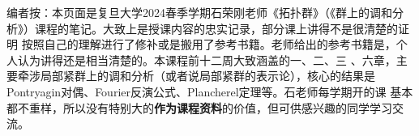 \newcommand{\cA}{\mathcal{A}}
\newcommand{\bnh}{\mathcal{B}}
\newcommand{\C}{\mathbb{C}}
\newcommand{\T}{\mathbb{T}}
\newcommand{\A}{\hat{A}}
\newcommand{\cc}{\mathcal{C}}
\newcommand{\Q}{\mathbb{Q}}
\newcommand{\F}{\mathbb{F}}
\newcommand{\1}{\mathbb{1}}
\newcommand{\pu}{\mathcal{P}}
\newcommand{\G}{\hat{G}}
\newcommand{\Tr}{\operatorname{Tr}}
\newcommand{\Map}{\operatorname{Map}}
\newcommand{\Hom}{\operatorname{Hom}}
\newcommand{\Supp}{\operatorname{Supp}}
\newcommand{\as}{|\ \ |}
\newcommand{\f}{\hat{f}}
\newcommand{\Hil}{\mathcal{H}}
\newcommand{\U}{\mathcal{U}}
\newcommand{\dd}{\:\mathrm{d}}
\newcommand{\tpq}{\mathbf{TopGrp}}
\newcommand{\ad}{\mathbb{A}}
\newcommand{\Oo}{\mathcal{O}}
编者按：本页面是复旦大学2024春季学期石荣刚老师《拓扑群》（《群上的调和分析》）课程的笔记。大致上是授课内容的忠实记录，部分课上讲得不是很清楚的证明
按照自己的理解进行了修补或是搬用了参考书籍。老师给出的参考书籍是\cite{Pr}，个人认为讲得还是相当清楚的。本课程前十二周大致涵盖\cite{Pr}的一、二、三
、六章，主要牵涉局部紧群上的调和分析（或者说局部紧群的表示论），核心的结果是Pontryagin对偶、Fourier反演公式、Plancherel定理等。石老师每学期开的课
基本都不重样，所以没有特别大的\textbf{作为课程资料}的价值，但可供感兴趣的同学学习交流。
